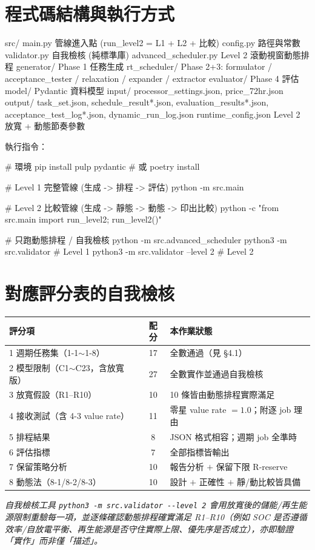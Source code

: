 \documentclass[12pt,a4paper,fontset=none]{ctexart}
\newcommand{\fn}[1]{\texttt{\small #1}}
\begin{document}
\section{程式碼結構與執行方式}
\begin{code}
src/
  main.py              管線進入點 (run_level2 = L1 + L2 + 比較)
  config.py            路徑與常數
  validator.py         自我檢核 (純標準庫)
  advanced_scheduler.py  Level 2 滾動視窗動態排程
  generator/           Phase 1 任務生成
  rt_scheduler/        Phase 2+3: formulator / acceptance_tester /
                        relaxation / expander / extractor
  evaluator/           Phase 4 評估
  model/               Pydantic 資料模型
input/   processor_settings.json, price_72hr.json
output/  task_set.json, schedule_result*.json, evaluation_results*.json,
         acceptance_test_log*.json, dynamic_run_log.json
runtime_config.json    Level 2 放寬 + 動態節奏參數
\end{code}
執行指令：
\begin{code}
# 環境
pip install pulp pydantic          # 或 poetry install

# Level 1 完整管線 (生成 -> 排程 -> 評估)
python -m src.main

# Level 2 比較管線 (生成 -> 靜態 -> 動態 -> 印出比較)
python -c "from src.main import run_level2; run_level2()"

# 只跑動態排程 / 自我檢核
python -m src.advanced_scheduler
python3 -m src.validator              # Level 1
python3 -m src.validator --level 2    # Level 2
\end{code}

\section{對應評分表的自我檢核}
\begin{center}
\begin{tabularx}{\linewidth}{Xcl}
\toprule
\textbf{評分項} & \textbf{配分} & \textbf{本作業狀態} \\
\midrule
1 週期任務集（1-1$\sim$1-8） & 17 & 全數通過（見 §4.1） \\
2 模型限制（C1$\sim$C23，含放寬版） & 27 & 全數實作並通過自我檢核 \\
3 放寬假設（R1--R10） & 10 & 10 條皆由動態排程實際滿足 \\
4 接收測試（含 4-3 value rate） & 11 & 零星 value rate $=1.0$；附逐 job 理由 \\
5 排程結果 & 8 & JSON 格式相容；週期 job 全準時 \\
6 評估指標 & 7 & 全部指標皆輸出 \\
7 保留策略分析 & 10 & 報告分析 $+$ 保留下限 R-reserve \\
8 動態法（8-1/8-2/8-3） & 10 & 設計 $+$ 正確性 $+$ 靜/動比較皆具備 \\
\bottomrule
\end{tabularx}
\end{center}
\noindent\textit{自我檢核工具 \fn{python3 -m src.validator -{}-level 2} 會用放寬後的儲能/再生能源限制重驗每一項，並逐條確認動態排程確實滿足 R1--R10（例如 SOC 是否遵循效率/自放電平衡、再生能源是否守住實際上限、優先序是否成立），亦即驗證「實作」而非僅「描述」。}
\end{document}
